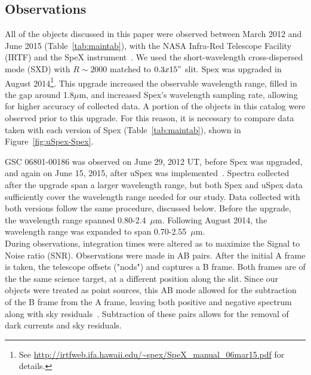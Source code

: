 \subsection{Observations}

All of the objects discussed in this paper were observed between 
March 2012 and June 2015 (Table~\ref{tab:maintab}), with the 
NASA Infra-Red Telescope Facility (IRTF) and the SpeX 
instrument~\cite{Rayner_1998}. We used the short-wavelength cross-dispersed 
mode (SXD) with $R ∼ 2000$ matched to $0.3x15"$ slit.  Spex was upgraded in August 2014\footnote{See \url{http://irtfweb.ifa.hawaii.edu/~spex/SpeX_manual_06mar15.pdf} for details.}. 
This upgrade increased the observable wavelength range, filled 
in the gap around 1.8$\mu$m, and increased Spex's wavelength 
sampling rate, allowing for higher accuracy of collected data.
A portion of the objects in this catalog were observed prior to this upgrade.  
For this reason, it is necessary to compare data taken with each version of Spex (Table~\ref{tab:maintab}), 
shown in Figure~\ref{fig:uSpex-Spex}.



GSC 06801-00186 was observed on June 29, 
2012 UT, before Spex was upgraded, and again on June 15, 2015, after uSpex 
was implemented~\cite{Spextool_Manual_Cushing_2015}.  Spectra collected after 
the upgrade span a larger wavelength range, but both Spex and uSpex data sufficiently 
cover the wavelength range needed for our study.  Data collected with both versions 
follow the same procedure, discussed below.  Before the upgrade, the wavelength 
range spanned 0.80-2.4~$\mu$m.  Following August 2014, the wavelength range 
was expanded to span 0.70-2.55~$\mu$m.\\

 



During observations, integration times were altered as to maximize the Signal to Noise ratio (SNR).  
Observations were made in AB pairs.  After the initial A frame is taken, the telescope offsets ("nods") and captures a B frame.  Both frames are of the the same science target, at a different position along the slit.  Since our objects were treated as point sources, this AB mode allowed for the subtraction of the B frame from the A frame, leaving both positive and negative spectrum along with sky residuals~\cite{Cushing_2004}. Subtraction of these pairs allows for the removal of dark currents and sky residuals.



